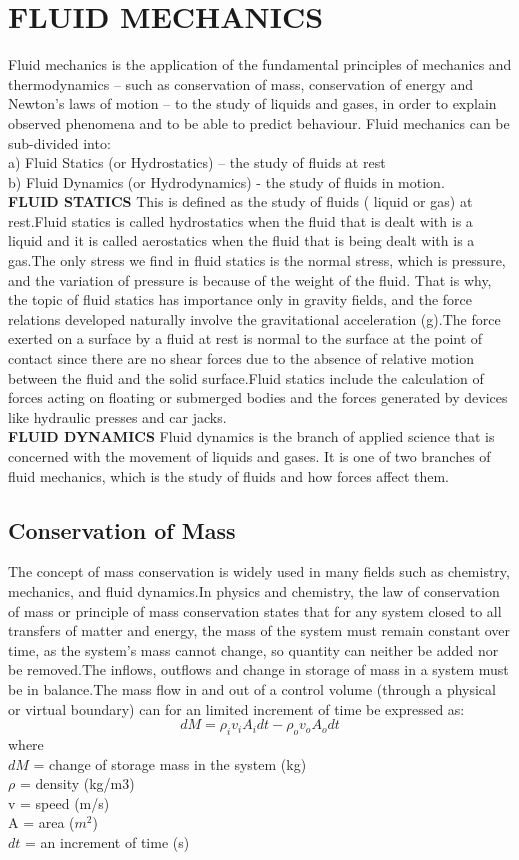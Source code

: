 \documentclass[a4paper,12pt]{report}
\begin{document}
{\section{FLUID MECHANICS}
Fluid mechanics is the application of the fundamental principles of mechanics and thermodynamics – such as conservation of mass, conservation of energy and Newton’s laws of motion – to the study of liquids and gases, in order to explain observed phenomena and to be able to predict behaviour. Fluid mechanics can be sub-divided into:\\
a) Fluid Statics (or Hydrostatics) – the study of fluids at rest\\ 
b) Fluid Dynamics (or Hydrodynamics) - the study of fluids in motion.\\
\textbf{FLUID STATICS}
This is defined as the study of fluids ( liquid or gas) at rest.Fluid statics is called hydrostatics when the fluid that is dealt with is a liquid and it is called aerostatics when the fluid that is being dealt with is a gas.The only stress we find in fluid statics is the normal stress, which is pressure, and the variation of pressure is because of the weight of the fluid. That is why, the topic of fluid statics has importance only in gravity fields, and the force relations developed naturally involve the gravitational acceleration (g).The force exerted on a surface by a fluid at rest is normal to the surface at the point of contact since there are no shear forces due to the absence of relative motion between the fluid and the solid surface.Fluid statics include the calculation of forces acting on floating or submerged bodies and the forces generated by devices like hydraulic presses and car jacks.\\ 
\textbf{FLUID DYNAMICS}
Fluid dynamics is the branch of applied science that is concerned with the movement of liquids and gases. It is one of two branches of fluid mechanics, which is the study of fluids and how forces affect them.
\subsection{Conservation of Mass}
The concept of mass conservation is widely used in many fields such as chemistry, mechanics, and fluid dynamics.In physics and chemistry, the law of conservation of mass or principle of mass conservation states that for any system closed to all transfers of matter and energy, the mass of the system must remain constant over time, as the system's mass cannot change, so quantity can neither be added nor be removed.The inflows, outflows and change in storage of mass in a system must be in balance.The mass flow in and out of a control volume (through a physical or virtual boundary) can for an limited increment of time be expressed as:
$$dM = \rho_i v_i A_i dt - \rho_o v_o A_o dt$$                            
where\\
$dM$ = change of storage mass in the system (kg)\\
$\rho$ = density (kg/m3)\\
v = speed (m/s)\\
A = area ($m^2$)\\
$dt$ = an increment of time (s)

}
\end{document}
